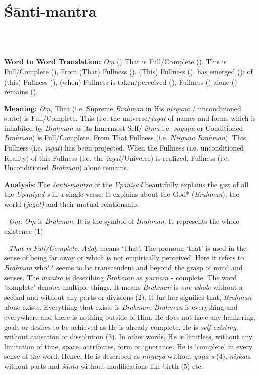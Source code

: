 \chapter{Śānti-mantra}

\begin{moolashloka}
\\
\\
\end{moolashloka}

\textbf{Word to Word Translation:} \emph{Oṃ} () That is Full/Complete (), This is Full/Complete (), From (That) Fullness (), (This) Fullness (), has emerged (); of (this) Fullness (), (when) Fullness is taken/perceived (), Fullness () alone () remains ().

\textbf{Meaning:} \emph{Oṃ}, That (i.e. Supreme \emph{Brahman} in His \emph{nirguṇa} / unconditioned state) is Full/Complete. This (i.e. the universe/\emph{jagat} of names and forms which is inhabited by \emph{Brahman} as its Innermost Self/ \emph{ātma} i.e. \emph{saguṇa} or Conditioned \emph{Brahman}) is Full/Complete. From That Fullness (i.e. \emph{Nirguṇa} \emph{Brahman}), This Fullness (i.e. \emph{jagat}) has been projected. When the Fullness (i.e. unconditioned Reality) of this Fullness (i.e. the \emph{jagat}/Universe) is realized, Fullness (i.e. Unconditioned \emph{Brahman}) alone remains.

\textbf{Analysis}: The \emph{śānti-mantra} of the \emph{Upaniṣad} beautifully explains the gist of all the \emph{Upaniṣad-s} in a single verse. It explains about the God* (\emph{Brahman}), the world (\emph{jagat)} and their mutual relationship.

- \emph{Oṃ.} \emph{Oṃ} is \emph{Brahman}. It is the symbol of \emph{Brahman}. It represents the whole existence (1).

- \emph{That is Full/Complete}. \emph{Adaḥ} means `That'. The pronoun `that' is used in the sense of being far away or which is not empirically perceived. Here it refers to \emph{Brahman} who** seems to be transcendent and beyond the grasp of mind and senses. The \emph{mantra} is describing \emph{Brahman} as \emph{pūrṇam} - complete. The word `complete' denotes multiple things. It means \emph{Brahman} is \emph{one whole} without a second and without any parts or divisions (2). It further signifies that, \emph{Brahman} alone exists. Everything that exists is \emph{Brahman}. \emph{Brahman} is everything and everywhere and there is nothing outside of Him. He does not have any hankering, goals or desires to be achieved as He is already complete. He is \emph{self-existing}, without causation or dissolution (3). In other words, He is limitless, without any limitation of time, space, attributes, form or ignorance. He is `complete' in every sense of the word. Hence, He is described as \emph{nirguṇa}-without \emph{guṇa-s} (4), \emph{niṣkala}-without parts and \emph{śānta}-without modifications like birth (5) etc.

